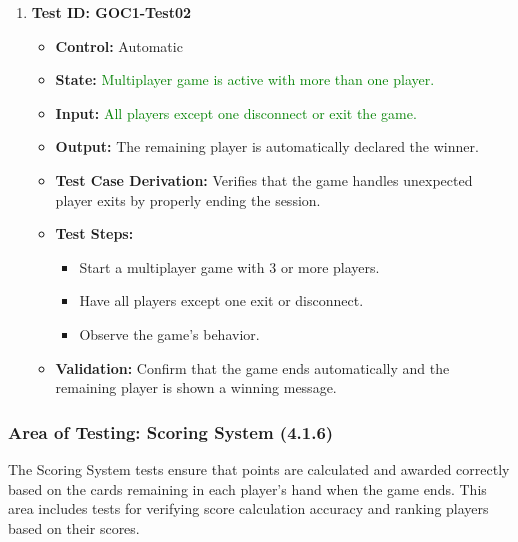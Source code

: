 \documentclass[12pt]{article}
\newcommand{\added}[1]{\textcolor{green}{#1}}
\begin{document}
\begin{enumerate}
    \item \textbf{Test ID: GOC1-Test02}
    \begin{itemize}
        \item \textbf{Control:} Automatic
        \item \textbf{State:} \added{Multiplayer game is active with more than one player.}
        \item \textbf{Input:} \added{All players except one disconnect or exit the game.}
        \item \textbf{Output:} The remaining player is automatically declared the winner.
        \item \textbf{Test Case Derivation:} Verifies that the game handles unexpected player exits by properly ending the session.
        \item \textbf{Test Steps:}
        \begin{itemize}
            \item Start a multiplayer game with 3 or more players.
            \item Have all players except one exit or disconnect.
            \item Observe the game’s behavior.
        \end{itemize}
        \item \textbf{Validation:} Confirm that the game ends automatically and the remaining player is shown a winning message.
    \end{itemize}
\end{enumerate}

\subsubsection{Area of Testing: Scoring System (4.1.6)}

The Scoring System tests ensure that points are calculated and awarded correctly based on the cards remaining in each player’s hand when the game ends. This area includes tests for verifying score calculation accuracy and ranking players based on their scores.
\end{document}
